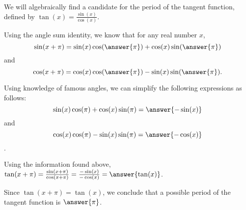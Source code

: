 \documentclass{ximera}
\author{Kenneth Berglund}
\begin{document}
We will algebraically find a candidate for the period of the tangent function, defined by $\tan(x) = \frac{\sin(x)}{\cos(x)}$.
\begin{exercise}
Using the angle sum identity, we know that for any real number $x$, 
$$
\sin(x + \pi)  = \sin(x)\cos(\answer{\pi}) + \cos(x)\sin(\answer{\pi})
$$
and
$$
\cos(x + \pi)  = \cos(x)\cos(\answer{\pi}) - \sin(x)\sin(\answer{\pi}).
$$

\begin{exercise}
Using knowledge of famous angles, we can simplify the following expressions as follows: $$\sin(x)\cos(\pi) + \cos(x)\sin(\pi) = \answer{-\sin(x)}$$ and $$\cos(x)\cos(\pi) -\sin(x)\sin(\pi) = \answer{-\cos(x)}$$.

\begin{exercise}
Using the information found above, $\tan(x + \pi) = \frac{\sin(x + \pi)}{\cos(x + \pi)} = \frac{-\sin(x)}{-\cos(x)} = \answer{\tan(x)}$. 

\begin{exercise}
Since $\tan(x + \pi) = \tan(x)$, we conclude that a possible period of the tangent function is $\answer{\pi}$. 



\end{exercise}

\end{exercise}
\end{exercise}
\end{exercise}
\end{document}

